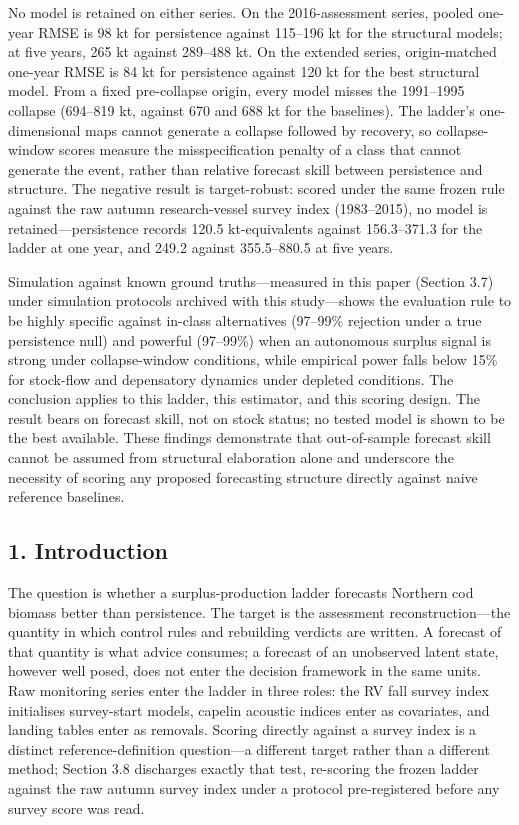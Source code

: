 \documentclass[11pt]{article}
\begin{document}
No model is retained on either series. On the 2016-assessment series,
pooled one-year RMSE is 98 kt for persistence against 115--196 kt for
the structural models; at five years, 265 kt against 289--488 kt. On the
extended series, origin-matched one-year RMSE is 84 kt for persistence
against 120 kt for the best structural model. From a fixed pre-collapse
origin, every model misses the 1991--1995 collapse (694--819 kt, against
670 and 688 kt for the baselines). The ladder's one-dimensional maps
cannot generate a collapse followed by recovery, so collapse-window
scores measure the misspecification penalty of a class that cannot
generate the event, rather than relative forecast skill between
persistence and structure. The negative result is target-robust: scored
under the same frozen rule against the raw autumn research-vessel survey
index (1983--2015), no model is retained---persistence records 120.5
kt-equivalents against 156.3--371.3 for the ladder at one year, and
249.2 against 355.5--880.5 at five years.

Simulation against known ground truths---measured in this paper (Section
3.7) under simulation protocols archived with this study---shows the
evaluation rule to be highly specific against in-class alternatives
(97--99\% rejection under a true persistence null) and powerful
(97--99\%) when an autonomous surplus signal is strong under
collapse-window conditions, while empirical power falls below 15\% for
stock-flow and depensatory dynamics under depleted conditions. The
conclusion applies to this ladder, this estimator, and this scoring
design. The result bears on forecast skill, not on stock status; no
tested model is shown to be the best available. These findings
demonstrate that out-of-sample forecast skill cannot be assumed from
structural elaboration alone and underscore the necessity of scoring any
proposed forecasting structure directly against naive reference
baselines.

\subsection{1. Introduction}\label{introduction}

The question is whether a surplus-production ladder forecasts Northern
cod biomass better than persistence. The target is the assessment
reconstruction---the quantity in which control rules and rebuilding
verdicts are written. A forecast of that quantity is what advice
consumes; a forecast of an unobserved latent state, however well posed,
does not enter the decision framework in the same units. Raw monitoring
series enter the ladder in three roles: the RV fall survey index
initialises survey-start models, capelin acoustic indices enter as
covariates, and landing tables enter as removals. Scoring directly
against a survey index is a distinct reference-definition question---a
different target rather than a different method; Section 3.8 discharges
exactly that test, re-scoring the frozen ladder against the raw autumn
survey index under a protocol pre-registered before any survey score was
read.
\end{document}
